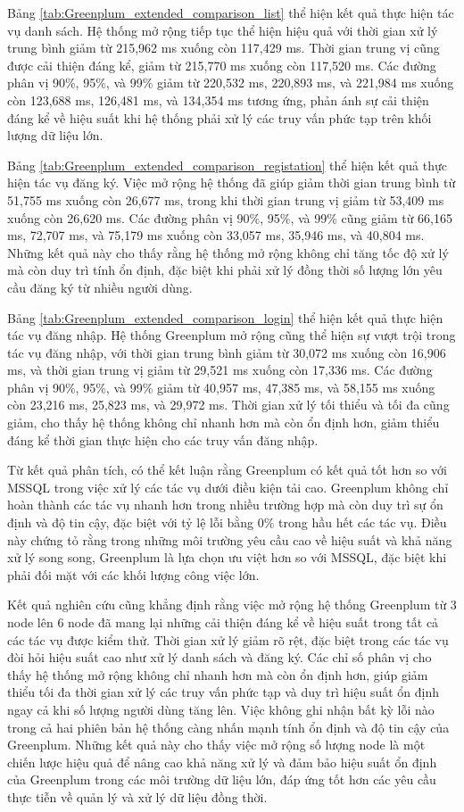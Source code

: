 Bảng \ref{tab:Greenplum_extended_comparison_list} thể hiện kết quả thực hiện tác vụ danh sách. Hệ thống mở rộng tiếp tục thể hiện hiệu quả với thời gian xử lý trung bình giảm từ 215,962 ms xuống còn 117,429 ms. Thời gian trung vị cũng được cải thiện đáng kể, giảm từ 215,770 ms xuống còn 117,520 ms. Các đường phân vị 90\%, 95\%, và 99\% giảm từ 220,532 ms, 220,893 ms, và 221,984 ms xuống còn 123,688 ms, 126,481 ms, và 134,354 ms tương ứng, phản ánh sự cải thiện đáng kể về hiệu suất khi hệ thống phải xử lý các truy vấn phức tạp trên khối lượng dữ liệu lớn.

Bảng \ref{tab:Greenplum_extended_comparison_registation} thể hiện kết quả thực hiện tác vụ đăng ký. Việc mở rộng hệ thống đã giúp giảm thời gian trung bình từ 51,755 ms xuống còn 26,677 ms, trong khi thời gian trung vị giảm từ 53,409 ms xuống còn 26,620 ms. Các đường phân vị 90\%, 95\%, và 99\% cũng giảm từ 66,165 ms, 72,707 ms, và 75,179 ms xuống còn 33,057 ms, 35,946 ms, và 40,804 ms. Những kết quả này cho thấy rằng hệ thống mở rộng không chỉ tăng tốc độ xử lý mà còn duy trì tính ổn định, đặc biệt khi phải xử lý đồng thời số lượng lớn yêu cầu đăng ký từ nhiều người dùng.

Bảng \ref{tab:Greenplum_extended_comparison_login} thể hiện kết quả thực hiện tác vụ đăng nhập. Hệ thống Greenplum mở rộng cũng thể hiện sự vượt trội trong tác vụ đăng nhập, với thời gian trung bình giảm từ 30,072 ms xuống còn 16,906 ms, và thời gian trung vị giảm từ 29,521 ms xuống còn 17,336 ms. Các đường phân vị 90\%, 95\%, và 99\% giảm từ 40,957 ms, 47,385 ms, và 58,155 ms xuống còn 23,216 ms, 25,823 ms, và 29,972 ms. Thời gian xử lý tối thiểu và tối đa cũng giảm, cho thấy hệ thống không chỉ nhanh hơn mà còn ổn định hơn, giảm thiểu đáng kể thời gian thực hiện cho các truy vấn đăng nhập.



Từ kết quả phân tích, có thể kết luận rằng Greenplum có kết quả tốt hơn so với MSSQL trong việc xử lý các tác vụ dưới điều kiện tải cao. Greenplum không chỉ hoàn thành các tác vụ nhanh hơn trong nhiều trường hợp mà còn duy trì sự ổn định và độ tin cậy, đặc biệt với tỷ lệ lỗi bằng 0\% trong hầu hết các tác vụ. Điều này chứng tỏ rằng trong những môi trường yêu cầu cao về hiệu suất và khả năng xử lý song song, Greenplum là lựa chọn ưu việt hơn so với MSSQL, đặc biệt khi phải đối mặt với các khối lượng công việc lớn.

Kết quả nghiên cứu cũng khẳng định rằng việc mở rộng hệ thống Greenplum từ 3 node lên 6 node đã mang lại những cải thiện đáng kể về hiệu suất trong tất cả các tác vụ được kiểm thử. Thời gian xử lý giảm rõ rệt, đặc biệt trong các tác vụ đòi hỏi hiệu suất cao như xử lý danh sách và đăng ký. Các chỉ số phân vị cho thấy hệ thống mở rộng không chỉ nhanh hơn mà còn ổn định hơn, giúp giảm thiểu tối đa thời gian xử lý các truy vấn phức tạp và duy trì hiệu suất ổn định ngay cả khi số lượng người dùng tăng lên. Việc không ghi nhận bất kỳ lỗi nào trong cả hai phiên bản hệ thống càng nhấn mạnh tính ổn định và độ tin cậy của Greenplum. Những kết quả này cho thấy việc mở rộng số lượng node là một chiến lược hiệu quả để nâng cao khả năng xử lý và đảm bảo hiệu suất ổn định của Greenplum trong các môi trường dữ liệu lớn, đáp ứng tốt hơn các yêu cầu thực tiễn về quản lý và xử lý dữ liệu đồng thời.
